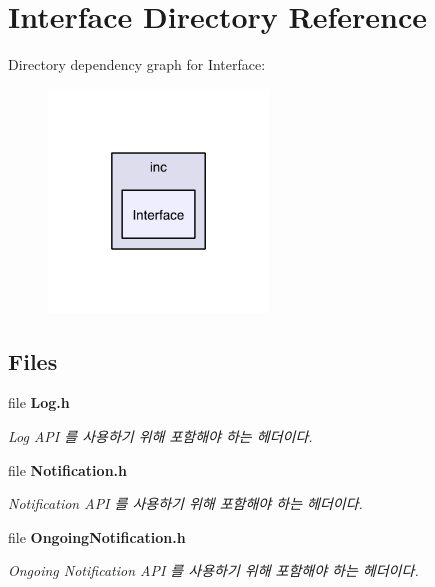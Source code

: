 \section{Interface Directory Reference}
\label{dir_f12671cad1e45398bf1c62a01e7076a3}
Directory dependency graph for Interface\-:
\nopagebreak
\begin{figure}[H]
\begin{center}
\leavevmode
\includegraphics[width=166pt]{dir_f12671cad1e45398bf1c62a01e7076a3_dep}
\end{center}
\end{figure}
\subsection*{Files}
\begin{DoxyCompactItemize}
\item 
file {\bf Log.\-h}
\begin{DoxyCompactList}\small\item\em Log A\-P\-I 를 사용하기 위해 포함해야 하는 헤더이다. \end{DoxyCompactList}\item 
file {\bf Notification.\-h}
\begin{DoxyCompactList}\small\item\em Notification A\-P\-I 를 사용하기 위해 포함해야 하는 헤더이다. \end{DoxyCompactList}\item 
file {\bf Ongoing\-Notification.\-h}
\begin{DoxyCompactList}\small\item\em Ongoing Notification A\-P\-I 를 사용하기 위해 포함해야 하는 헤더이다. \end{DoxyCompactList}\end{DoxyCompactItemize}
